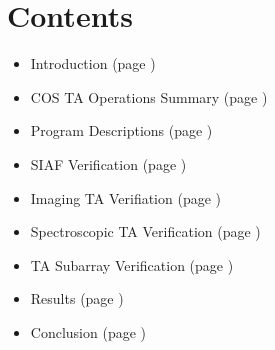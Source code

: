 \section*{Contents}

\begin{itemize}
\item Introduction (page \pageref{sec:Introduction})
\item COS TA Operations Summary (page \pageref{sec:TAoperations})
\item Program Descriptions (page \pageref{sec:programs})
\item SIAF Verification (page \pageref{sec:siaf})
\item Imaging TA Verifiation (page \pageref{sec:NimVER})
\item Spectroscopic TA Verification (page \pageref{sec:spVER})
\item TA Subarray Verification (page \pageref{sec:subarray})
\item Results (page \pageref{sec:results})
\item Conclusion (page \pageref{sec:theend})
\end{itemize}
